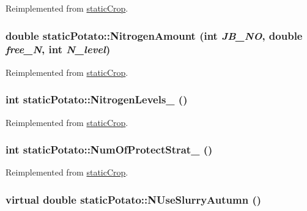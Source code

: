Reimplemented from \hyperlink{classstatic_crop_a9b67ef1ae531a3afb32b63a4aeb5916b}{staticCrop}.\hypertarget{classstatic_potato_a31f9e7eda42f5d73982b2704728d7c1c}{
\subsubsection[{NitrogenAmount}]{\setlength{\rightskip}{0pt plus 5cm}double staticPotato::NitrogenAmount (int {\em JB\_\-NO}, \/  double {\em free\_\-N}, \/  int {\em N\_\-level})}}
\label{classstatic_potato_a31f9e7eda42f5d73982b2704728d7c1c}


Reimplemented from \hyperlink{classstatic_crop_af3aa85321a8a75406f8a0751b71587d0}{staticCrop}.\hypertarget{classstatic_potato_a7471a5c80f252c89ca3fc9cb0d12c619}{
\subsubsection[{NitrogenLevels\_\-}]{\setlength{\rightskip}{0pt plus 5cm}int staticPotato::NitrogenLevels\_\- ()}}
\label{classstatic_potato_a7471a5c80f252c89ca3fc9cb0d12c619}


Reimplemented from \hyperlink{classstatic_crop_a32b69ed138beaed150efa74d18e82d8e}{staticCrop}.\hypertarget{classstatic_potato_a04dc5840220a6ecc1bac5688a80821ae}{
\subsubsection[{NumOfProtectStrat\_\-}]{\setlength{\rightskip}{0pt plus 5cm}int staticPotato::NumOfProtectStrat\_\- ()}}
\label{classstatic_potato_a04dc5840220a6ecc1bac5688a80821ae}


Reimplemented from \hyperlink{classstatic_crop_a4d3d767f569f48eb68ffa76822302467}{staticCrop}.\hypertarget{classstatic_potato_ad28100ca6e12fc541684b794fea058d2}{
\subsubsection[{NUseSlurryAutumn}]{\setlength{\rightskip}{0pt plus 5cm}virtual double staticPotato::NUseSlurryAutumn ()}}
\label{classstatic_potato_ad28100ca6e12fc541684b794fea058d2}


